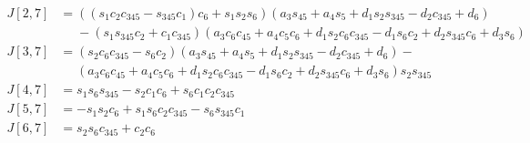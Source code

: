 \documentclass{article}
\begin{document}
\begin{align*}
J[2,7] &= \left(\left(s_{1} c_{2} c_{345} - s_{345} c_{1}\right) c_{6} + s_{1} s_{2} s_{6}\right) \left(a_{3} s_{45} + a_{4} s_{5} + d_{1} s_{2} s_{345} - d_{2} c_{345} + d_{6}\right) \\
       &\phantom{=}- \left(s_{1} s_{345} c_{2} + c_{1} c_{345}\right) \left(a_{3} c_{6} c_{45} + a_{4} c_{5} c_{6} + d_{1} s_{2} c_{6} c_{345} - d_{1} s_{6} c_{2} + d_{2} s_{345} c_{6} + d_{3} s_{6}\right) \\
J[3,7] &= \left(s_{2} c_{6} c_{345} - s_{6} c_{2}\right) \left(a_{3} s_{45} + a_{4} s_{5} + d_{1} s_{2} s_{345} - d_{2} c_{345} + d_{6}\right) - \\
       &\phantom{=}\left(a_{3} c_{6} c_{45} + a_{4} c_{5} c_{6} + d_{1} s_{2} c_{6} c_{345} - d_{1} s_{6} c_{2} + d_{2} s_{345} c_{6} + d_{3} s_{6}\right) s_{2} s_{345} \\
J[4,7] &= s_{1} s_{6} s_{345} - s_{2} c_{1} c_{6} + s_{6} c_{1} c_{2} c_{345} \\
J[5,7] &= - s_{1} s_{2} c_{6} + s_{1} s_{6} c_{2} c_{345} - s_{6} s_{345} c_{1} \\
J[6,7] &= s_{2} s_{6} c_{345} + c_{2} c_{6} \\
\end{align*}
\end{document}
